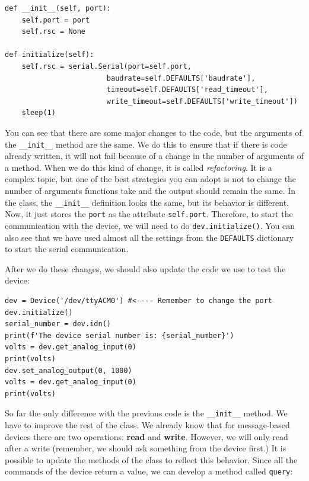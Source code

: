 \begin{verbatim}
def __init__(self, port):
    self.port = port
    self.rsc = None

def initialize(self):
    self.rsc = serial.Serial(port=self.port,
                        baudrate=self.DEFAULTS['baudrate'],
                        timeout=self.DEFAULTS['read_timeout'],
                        write_timeout=self.DEFAULTS['write_timeout'])
    sleep(1)
\end{verbatim}

You can see that there are some major changes to the code, but the arguments of the \texttt{__init__} method are the same. We do this
to ensure that if there is code already written, it will not fail because of a change in the number of arguments of a method. When we do this kind of change, it is called \emph{refactoring}. It is a complex topic, but one of the best strategies you can adopt is not to change the number of arguments functions take and the output should remain the same. In the class, the \texttt{__init__} definition looks the same, but its behavior is different. Now, it just stores the \texttt{port} as the attribute \texttt{self.port}. Therefore, to start the communication with the device, we will need to do \texttt{dev.initialize()}. You can also see that we have used almost all the settings from the \texttt{DEFAULTS} dictionary to start the serial communication.

After we do these changes, we should also update the code we use to test the device:

\begin{verbatim}
dev = Device('/dev/ttyACM0') #<---- Remember to change the port
dev.initialize()
serial_number = dev.idn()
print(f'The device serial number is: {serial_number}')
volts = dev.get_analog_input(0)
print(volts)
dev.set_analog_output(0, 1000)
volts = dev.get_analog_input(0)
print(volts)
\end{verbatim}

So far the only difference with the previous code is the \texttt{__init__} method. We have to improve the rest of the class. We already know that for message-based devices there are two operations: \textbf{read} and \textbf{write}. However, we will only read after a write (remember, we should ask something from the device first.) It is possible to update the methods of the class to reflect this behavior. Since all the commands of the device return a value, we can develop a method called \texttt{query}:

